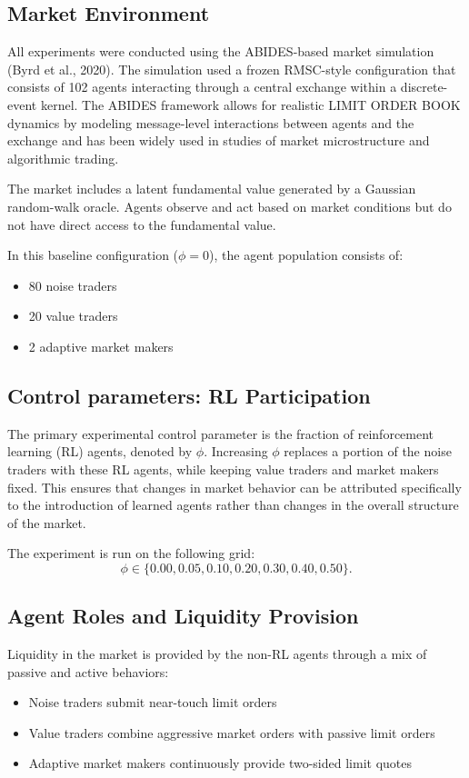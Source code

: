 \documentclass[11pt]{article}
\begin{document}
\subsection{Market Environment}

All experiments were conducted using the ABIDES-based market simulation (Byrd et al., 2020). The simulation used a frozen RMSC-style configuration that consists of 102 agents interacting through a central exchange within a discrete-event kernel. The ABIDES framework allows for realistic LIMIT ORDER BOOK dynamics by modeling message-level interactions between agents and the exchange and has been widely used in studies of market microstructure and algorithmic trading.

The market includes a latent fundamental value generated by a Gaussian random-walk oracle. Agents observe and act based on market conditions but do not have direct access to the fundamental value.

In this baseline configuration ($\phi = 0$), the agent population consists of:
\begin{itemize}[leftmargin=2em]
    \item 80 noise traders
    \item 20 value traders
    \item 2 adaptive market makers
\end{itemize}

\subsection{Control parameters: RL Participation}

The primary experimental control parameter is the fraction of reinforcement learning (RL) agents, denoted by $\phi$. Increasing $\phi$ replaces a portion of the noise traders with these RL agents, while keeping value traders and market makers fixed. This ensures that changes in market behavior can be attributed specifically to the introduction of learned agents rather than changes in the overall structure of the market.

The experiment is run on the following grid:
\[
\phi \in \{0.00, 0.05, 0.10, 0.20, 0.30, 0.40, 0.50\}.
\]

\subsection{Agent Roles and Liquidity Provision}

Liquidity in the market is provided by the non-RL agents through a mix of passive and active behaviors:
\begin{itemize}[leftmargin=2em]
    \item Noise traders submit near-touch limit orders
    \item Value traders combine aggressive market orders with passive limit orders
    \item Adaptive market makers continuously provide two-sided limit quotes
\end{itemize}
\end{document}
